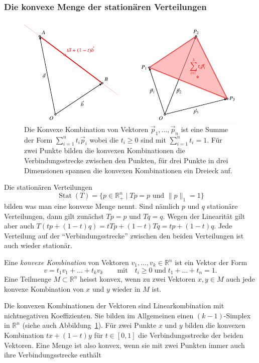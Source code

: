 \subsubsection{Die konvexe Menge der stationären Verteilungen}
\begin{figure}
\centering
\includegraphics{chapters/80-wahrscheinlichkeit/images/konvex.pdf}
\caption{Die Konvexe Kombination von Vektoren $\vec{p}_1,\dots,\vec{p}_n$ ist
eine Summe der Form $\sum_{i=1}^n t_i\vec{p}_i$ wobei die $t_i\ge 0$
sind mit $\sum_{i=1}^nt_i=1$.
Für zwei Punkte bilden die konvexen Kombinationen die Verbindungsstrecke
zwischen den Punkten, für drei Punkte in drei Dimensionen spannen die
konvexen Kombinationen ein Dreieck auf.
\label{buch:wahrscheinlichkeit:fig:konvex}}
\end{figure}
Die stationären Verteilungen
\[
\operatorname{Stat}(T)
=
\{
p\in\mathbb R_+^n \mid \text{$Tp=p $ und $\|p\|_1=1$}
\}
\]
bilden was man eine konvexe Menge nennt.
Sind nämlich $p$ und $q$ stationäre Verteilungen, dann gilt zunächst
$Tp=p$ und $Tq=q$.
Wegen der Linearität gilt aber auch $T(tp+(1-t)q)=tTp + (1-t)Tq
=tp+(1-t)q$.
Jede Verteilung auf der ``Verbindungsstrecke'' zwischen den beiden
Verteilungen ist auch wieder stationär.

\begin{definition}
Eine {\em konvexe Kombination} von Vektoren $v_1,\dots,v_k\in\mathbb{R}^n$
ist ein Vektor der Form
\[
v=t_1v_1+\dots + t_kv_k
\qquad\text{mit}\quad
t_i\ge 0\;\text{und}\;
t_1+\dots+t_n = 1.
\]
%
Eine Teilmenge $M\subset \mathbb{R}^n$ heisst konvex, wenn zu
zwei Vektoren $x,y\in M$ auch jede konvexe Kombination von $x$ und $y$
wieder in $M$ ist.
%
\end{definition}

Die konvexen Kombinationen der Vektoren sind Linearkombination
mit nichtnegativen Koeffizienten. Sie bilden im Allgemeinen
einen $(k-1)$-Simplex in $\mathbb{R}^n$ (siehe auch
Abbildung~\ref{buch:wahrscheinlichkeit:fig:konvex}).
Für zwei Punkte $x$ und $y$ bilden die konvexen Kombination
$tx+(1-t)y$ für $t\in[0,1]$ die Verbindungsstrecke der beiden
Vektoren.
Eine Menge ist also konvex, wenn sie mit zwei Punkten immer auch
ihre Verbindungsstrecke enthält



